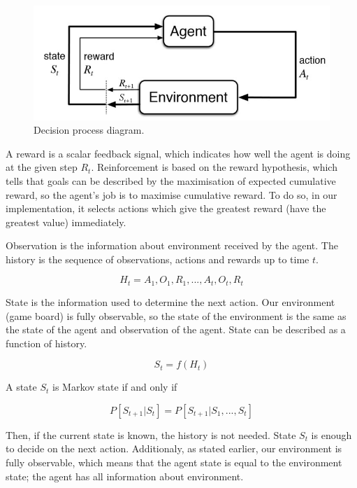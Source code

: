 \documentclass[a4paper,12pt]{book}
\begin{document}
\begin{figure}[!h]
	\includegraphics{./Images/RLdiag.jpg}
	\centering
	\caption{Decision process diagram\protect\footnotemark.}
	\label{fig:Capture1}
\end{figure}

A reward is a scalar feedback signal, which indicates how well the agent is doing at the given step $R_{t}$. Reinforcement is based on the reward hypothesis, which tells that goals can be described by the maximisation of expected cumulative reward, so the agent's job is to maximise cumulative reward. To do so, in our implementation, it selects actions which give the greatest reward (have the greatest value) immediately. 

Observation is the information about environment received by the agent. The history is the sequence of observations, actions and rewards up to time $t$.

\begin{equation}
	H_{t} = A_{1}, O_{1}, R_{1}, ...,  A_{t}, O_{t}, R_{t}
\end{equation}

State is the information used to determine the next action. Our environment (game board) is fully observable, so the state of the environment is the same as the state of the agent and observation of the agent. State can be described as a function of history.

\begin{equation}
	S_{t} = f(H_{t})
\end{equation}

A state $S_{t}$ is Markov state if and only if

\begin{equation}
	P[S_{t+1} | S_{t}] = P[S_{t+1} | S_{1}, ..., S_{t}]
\end{equation}

Then, if the current state is known, the history is not needed. State $S_{t}$ is enough to decide on the next action.
Additionaly, as stated earlier, our environment is fully observable, which means that the agent state is equal to the environment state; the agent has all information about environment.
\end{document}
